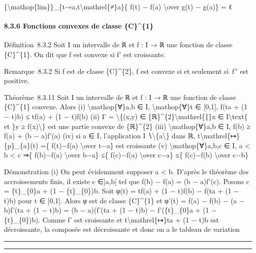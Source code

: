\documentclass[]{article}
\begin{document}
\{\textbackslash{}mathop\{lim\}\}\_\{t→a,t\textbackslash{}mathrel\{≠\}a\}\{
f(t) − f(a) \textbackslash{}over g(t) − g(a)\} = ℓ

\paragraph{8.3.6 Fonctions convexes de classe \{C\}\^{}\{1\}}

Définition~8.3.2 Soit I un intervalle de ℝ et f : I → ℝ une fonction de
classe \{C\}\^{}\{1\}. On dit que f est convexe si f' est croissante.

Remarque~8.3.2 Si f est de classe \{C\}\^{}\{2\}, f est convexe si et
seulement si~f'' est positive.

Théorème~8.3.11 Soit I un intervalle de ℝ et f : I → ℝ une fonction de
classe \{C\}\^{}\{1\} convexe. Alors (i) \textbackslash{}mathop\{∀\}a,b
∈ I, \textbackslash{}mathop\{∀\}t ∈ {[}0,1{]}, f(ta + (1 − t)b) ≤ tf(a)
+ (1 − t)f(b) (ii) Γ = \textbackslash{}\{(x,y) ∈
\{ℝ\}\^{}\{2\}\textbackslash{}mathrel\{∣\}x ∈ I\textbackslash{}text\{ et
\}y ≥ f(x)\textbackslash{}\} est une partie convexe de \{ℝ\}\^{}\{2\}
(iii) \textbackslash{}mathop\{∀\}a,b ∈ I, f(b) ≥ f(a) + (b − a)f'(a)
(iv) si a ∈ I, l'application I ∖\textbackslash{}\{a\textbackslash{}\}
dans ℝ, t\textbackslash{}mathrel\{↦\}\{p\}\_\{a\}(t) =\{ f(t)−f(a)
\textbackslash{}over t−a\} est croissante (v)
\textbackslash{}mathop\{∀\}a,b,c ∈ I, a \textless{} b \textless{} c ⇒\{
f(b)−f(a) \textbackslash{}over b−a\} ≤\{ f(c)−f(a) \textbackslash{}over
c−a\} ≤\{ f(c)−f(b) \textbackslash{}over c−b\}

Démonstration (i) On peut évidemment supposer a \textless{} b. D'après
le théorème des accroissements finis, il existe c ∈{]}a,b{[} tel que
f(b) − f(a) = (b − a)f'(c). Posons c = \{t\}\_\{0\}a + (1 −
\{t\}\_\{0\})b. Soit φ(t) = tf(a) + (1 − t)f(b) − f(ta + (1 − t)b) pour
t ∈ {[}0,1{]}. Alors φ est de classe \{C\}\^{}\{1\} et φ'(t) = f(a) −
f(b) − (a − b)f'(ta + (1 − t)b) = (b − a)(f'(ta + (1 − t)b) −
f'(\{t\}\_\{0\}a + (1 − \{t\}\_\{0\})b). Comme f' est croissante et
t\textbackslash{}mathrel\{↦\}ta + (1 − t)b est décroissante, la composée
est décroissante et donc on a le tableau de variation

\begin{center}\rule{3in}{0.4pt}\end{center}

\begin{center}\rule{3in}{0.4pt}\end{center}
\end{document}
